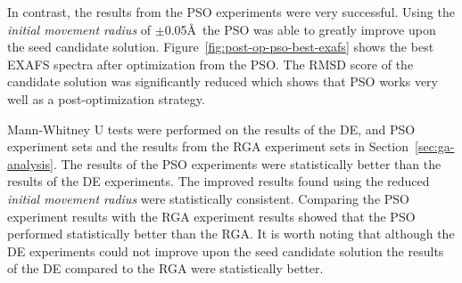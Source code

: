 In contrast, the results from the PSO experiments were very successful. Using the \textit{initial movement radius} of $\pm$0.05\AA\ the PSO was able to greatly improve upon the seed candidate solution. Figure~\ref{fig:post-op-pso-best-exafs} shows the best EXAFS spectra after optimization from the PSO. The RMSD score of the candidate solution was significantly reduced which shows that PSO works very well as a post-optimization strategy.

\begin{figure*}
	\centering
	\caption{OEC EXAFS Spectra Comparison}
	\label{fig:post-op-pso-best-exafs}
\end{figure*}

Mann-Whitney U tests were performed on the results of the DE, and PSO experiment sets and the results from the RGA experiment sets in Section~\ref{sec:ga-analysis}. The results of the PSO experiments were statistically better than the results of the DE experiments. The improved results found using the reduced \textit{initial movement radius} were statistically consistent. Comparing the PSO experiment results with the RGA experiment results showed that the PSO performed statistically better than the RGA. It is worth noting that although the DE experiments could not improve upon the seed candidate solution the results of the DE compared to the RGA were statistically better.